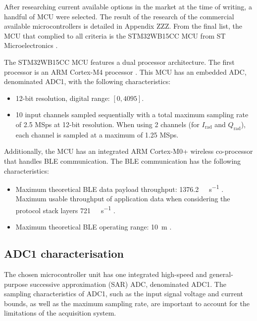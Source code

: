 After researching current available options in the market at the time of writing, a handful of MCU were selected. The result of the research of the commercial available microcontrollers is detailed in Appendix ZZZ. From the final list, the MCU that complied to all criteria is the STM32WB15CC MCU from ST Microelectronics \cite{STMicroelectronics2022}.

The STM32WB15CC MCU features a dual processor architecture. The first processor is an ARM Cortex-M4 processor \cite{STMicroelectronics2022}. This MCU has an embedded ADC, denominated ADC1, with the following characteristics:
\begin{itemize}
	\item 12-bit resolution, digital range: $[0, 4095]$.
	\item 10 input channels sampled sequentially with a total maximum sampling rate of 2.5 MSps at 12-bit resolution. When using 2 channels (for $I_\mathrm{rad}$ and $Q_\mathrm{rad}$), each channel is sampled at a maximum of 1.25 MSps.
\end{itemize}

Additionally, the MCU has an integrated ARM Cortex-M0+ wireless co-processor that handles BLE communication. The BLE communication has the following characteristics:
\begin{itemize}
	\item Maximum theoretical BLE data payload throughput: \SI{1376.2}{\kilo\bit\per\second} \cite{NordicSemiconductor2019,Bluetooth52}. Maximum usable throughput of application data when considering the protocol stack layers \SI{721}{\kilo\bit\per\second} \cite{STMicroelectronics2022b}.
	\item Maximum theoretical BLE operating range: \SI{10}{\meter} \cite{Bluetooth52}.
\end{itemize}

\subsection{ADC1 characterisation}

The chosen microcontroller unit has one integrated high-speed and general-purpose successive approximation (SAR) ADC, denominated ADC1. The sampling characteristics of ADC1, such as the input signal voltage and current bounds, as well as the maximum sampling rate, are important to account for the limitations of the acquisition system.

